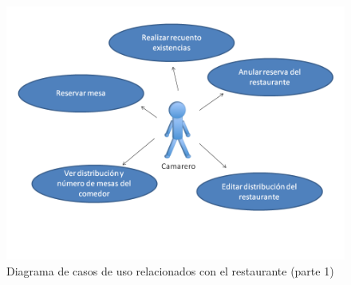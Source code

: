 \documentclass[spanish,a4paper,11pt, twoside]{report}	%
\begin{document}
	\begin{figure}[!h]
		\centering
		\includegraphics[scale=0.5]{Restaurante1.png}
		\caption{Diagrama de casos de uso relacionados con el restaurante (parte 1)}
	\end{figure}

		
\end{document}
